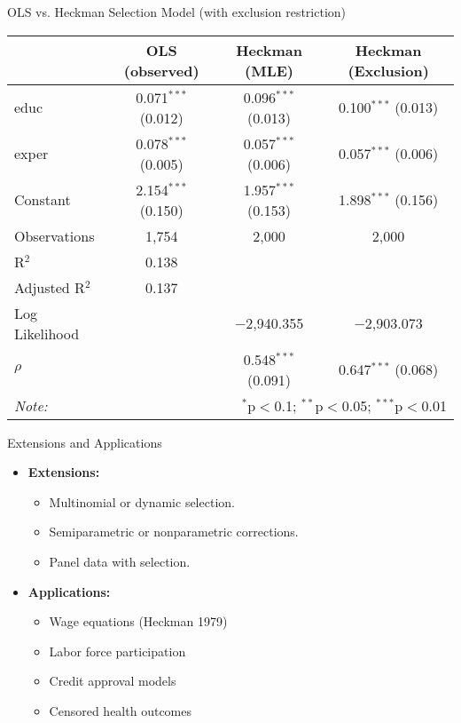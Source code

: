 \documentclass[aspectratio=169,11pt]{beamer}
\begin{document}
\begin{frame}{OLS vs. Heckman Selection Model (with exclusion restriction)}
\begin{center}
\begin{tabular}{@{\extracolsep{5pt}}lccc} 
\toprule
 & OLS (observed) & Heckman (MLE) & Heckman (Exclusion) \\ 
\midrule
 educ & 0.071$^{***}$ (0.012) & 0.096$^{***}$ (0.013) & 0.100$^{***}$ (0.013) \\ 
  exper & 0.078$^{***}$ (0.005) & 0.057$^{***}$ (0.006) & 0.057$^{***}$ (0.006) \\ 
  Constant & 2.154$^{***}$ (0.150) & 1.957$^{***}$ (0.153) & 1.898$^{***}$ (0.156) \\ 
\midrule
Observations & 1,754 & 2,000 & 2,000 \\ 
R$^{2}$ & 0.138 &  &  \\ 
Adjusted R$^{2}$ & 0.137 &  &  \\ 
Log Likelihood &  & $-$2,940.355 & $-$2,903.073 \\ 
$\rho$ &  & 0.548$^{***}$  (0.091) & 0.647$^{***}$  (0.068) \\ 
\bottomrule 
\textit{Note:}  & \multicolumn{3}{r}{$^{*}$p$<$0.1; $^{**}$p$<$0.05; $^{***}$p$<$0.01} \\
\end{tabular} 
\end{center}
\end{frame}



\begin{frame}{Extensions and Applications}
\begin{itemize}
    \item \textbf{Extensions:}
    \begin{itemize}
        \item Multinomial or dynamic selection.
        \item Semiparametric or nonparametric corrections.
        \item Panel data with selection.
    \end{itemize}
    \item \textbf{Applications:}
    \begin{itemize}
        \item Wage equations (Heckman 1979)
        \item Labor force participation
        \item Credit approval models
        \item Censored health outcomes
    \end{itemize}
\end{itemize}
\end{frame}
\end{document}
